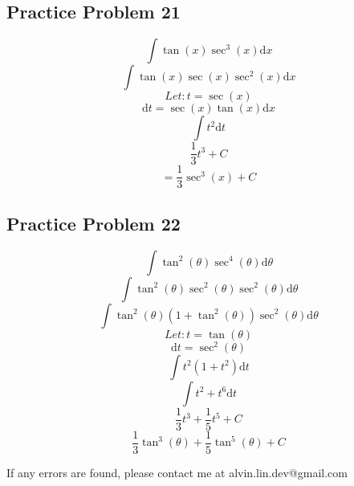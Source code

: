 \documentclass[letterpaper, 12pt]{article}
\newcommand*{\diff}{\mathrm{d}}
\begin{document}
\subsection*{Practice Problem 21}
\[ \int{\tan(x)\sec^{3}(x)\diff{x}} \]
\[ \int{\tan(x)\sec(x)\sec^{2}(x)\diff{x}} \]
\[ Let: t = \sec(x) \]
\[ \diff{t} = \sec(x)\tan(x)\diff{x} \]
\[ \int{t^{2}\diff{t}} \]
\[ \frac{1}{3}t^{3}+C \]
\[ = \frac{1}{3}\sec^{3}(x)+C \]

\subsection*{Practice Problem 22}
\[ \int{\tan^{2}(\theta)\sec^{4}(\theta)\diff{\theta}} \]
\[ \int{\tan^{2}(\theta)\sec^{2}(\theta)\sec^{2}(\theta)\diff{\theta}} \]
\[ \int{\tan^{2}(\theta)(1+\tan^{2}(\theta))\sec^{2}(\theta)\diff{\theta}} \]
\[ Let: t = \tan(\theta) \]
\[ \diff{t} = \sec^{2}(\theta) \]
\[ \int{t^{2}(1+t^{2})\diff{t}} \]
\[ \int{t^{2}+t^{6}\diff{t}} \]
\[ \frac{1}{3}t^{3}+\frac{1}{5}t^{5}+C \]
\[ \frac{1}{3}\tan^{3}(\theta)+\frac{1}{5}\tan^{5}(\theta)+C \]

\begin{center}
  If any errors are found, please contact me at alvin.lin.dev@gmail.com
\end{center}
\end{document}
